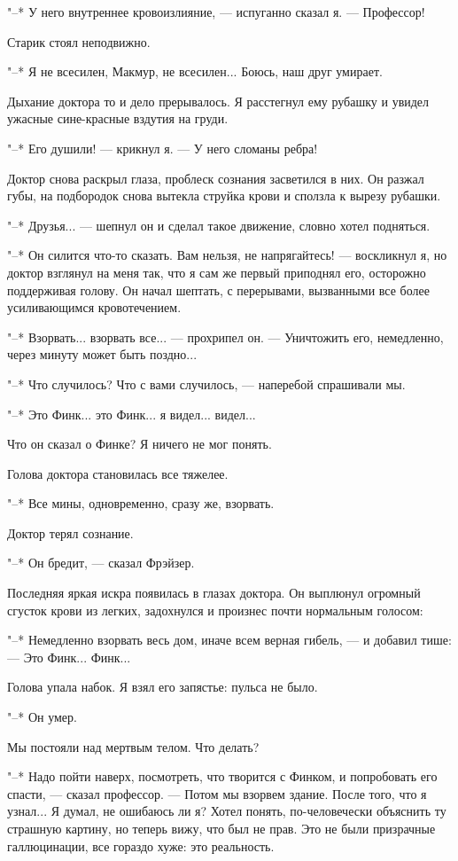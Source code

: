 "--* У него внутреннее кровоизлияние, --- испуганно сказал я. --- Профессор!

Старик стоял неподвижно.

"--* Я не всесилен, Макмур, не всесилен... Боюсь, наш друг умирает.

Дыхание доктора то и дело  прерывалось.  Я  расстегнул  ему  рубашку  и
увидел ужасные сине-красные вздутия на груди.

"--* Его душили! --- крикнул я. --- У него сломаны ребра!

Доктор снова раскрыл глаза, проблеск  сознания  засветился  в  них.  Он
разжал губы, на подбородок снова вытекла струйка крови и сползла к  вырезу
рубашки.

"--*  Друзья...  ---  шепнул  он  и  сделал  такое  движение,  словно  хотел
подняться.

"--* Он силится что-то сказать. Вам нельзя, не напрягайтесь! ---  воскликнул
я, но доктор взглянул на меня так, что я  сам  же  первый  приподнял  его,
осторожно поддерживая голову. Он начал шептать, с  перерывами,  вызванными
все более усиливающимся кровотечением.

"--* Взорвать...  взорвать  все...  ---  прохрипел  он.  ---  Уничтожить  его,
немедленно, через минуту может быть поздно...

"--* Что случилось? Что с вами случилось, --- наперебой спрашивали мы.

"--* Это Финк... это Финк... я видел... видел...

Что он сказал о Финке? Я ничего не мог понять.

Голова доктора становилась все тяжелее.

"--* Все мины, одновременно, сразу же, взорвать.

Доктор терял сознание.

"--* Он бредит, --- сказал Фрэйзер.

Последняя яркая искра появилась в глазах доктора. Он выплюнул  огромный
сгусток крови из легких, задохнулся и произнес почти нормальным голосом:

"--* Немедленно взорвать весь дом, иначе всем верная гибель, ---  и  добавил
тише: --- Это Финк... Финк...

Голова упала набок. Я взял его запястье: пульса не было.

"--* Он умер.

Мы постояли над мертвым телом. Что делать?

"--* Надо пойти наверх, посмотреть, что творится с Финком,  и  попробовать
его спасти, --- сказал профессор. --- Потом мы взорвем здание. После того, что
я узнал... Я  думал,  не  ошибаюсь  ли  я?  Хотел  понять,  по-человечески
объяснить ту страшную картину, но теперь вижу, что был  не  прав.  Это  не
были призрачные галлюцинации, все гораздо хуже: это реальность.

